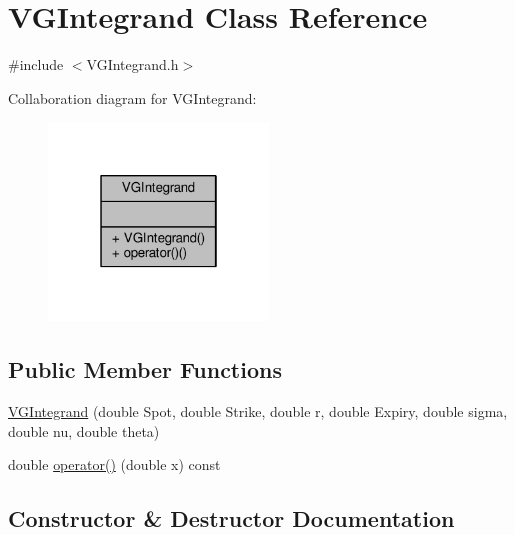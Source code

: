 \hypertarget{classVGIntegrand}{}\section{V\+G\+Integrand Class Reference}
\label{classVGIntegrand}


{\ttfamily \#include $<$V\+G\+Integrand.\+h$>$}



Collaboration diagram for V\+G\+Integrand\+:
\nopagebreak
\begin{figure}[H]
\begin{center}
\leavevmode
\includegraphics[width=166pt]{classVGIntegrand__coll__graph}
\end{center}
\end{figure}
\subsection*{Public Member Functions}
\begin{DoxyCompactItemize}
\item 
\hyperlink{classVGIntegrand_a614bc597c48554c6af07b0a758bdab3b}{V\+G\+Integrand} (double Spot, double Strike, double r, double Expiry, double sigma, double nu, double theta)
\item 
double \hyperlink{classVGIntegrand_afe06c29f37ea737a2460964799d268fc}{operator()} (double x) const
\end{DoxyCompactItemize}


\subsection{Constructor \& Destructor Documentation}
\hypertarget{classVGIntegrand_a614bc597c48554c6af07b0a758bdab3b}{}\label{classVGIntegrand_a614bc597c48554c6af07b0a758bdab3b} 
